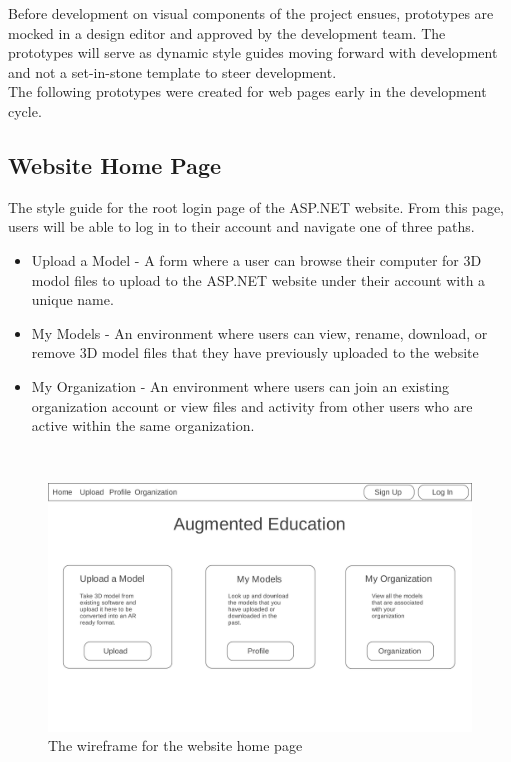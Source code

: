 \hspace{7mm}
Before development on visual components of the project ensues, prototypes are mocked in a
design editor and approved by the development team.  The prototypes will serve
as dynamic style guides moving forward with development and not a set-in-stone template
to steer development.\\

The following prototypes were created for web pages early in the development cycle.

\subsection{Website Home Page}
    \hspace{7mm} The style guide for the root login page of the ASP.NET website.
    From this page, users will be able to log in to their account and navigate 
    one of three paths.
        \begin{itemize} 
            \item Upload a Model -
                A form where a user can browse their computer for 3D modol files to
                upload to the ASP.NET website under their account with a unique name. 
            \item My Models - 
                An environment where users can view, rename, download, or remove
                3D model files that they have previously uploaded to the website
            \item My Organization -
                An environment where users can join an existing organization account
                or view files and activity from other users who are active within 
                the same organization.
        \end{itemize}
    \ \\
    \label{fig:proto_web_home}
    \begin{figure}[H]
        \centering \includegraphics[width=0.6\linewidth]{Home}
        \caption{The wireframe for the website home page}
    \end{figure}

